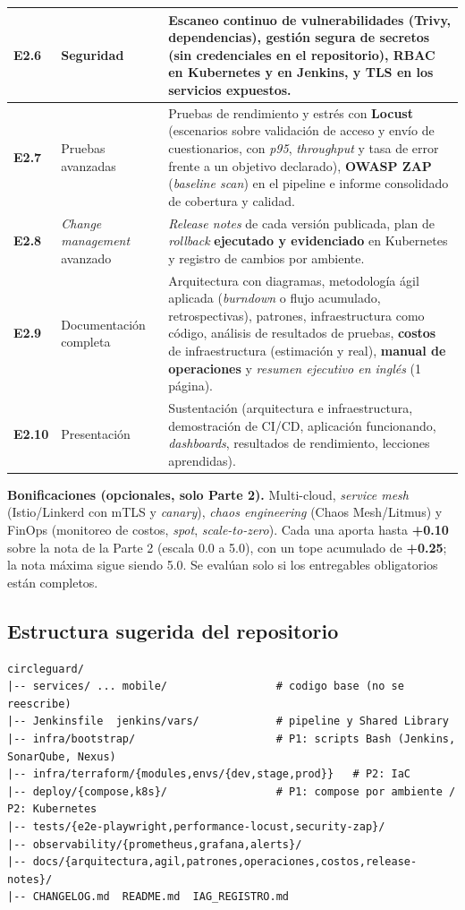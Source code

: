\documentclass[10pt,letterpaper]{article}
\begin{document}
\begin{tabularx}{\textwidth}{|L{1.0cm}|L{3.3cm}|X|}
\textbf{E2.6} & Seguridad & Escaneo continuo de vulnerabilidades (Trivy, dependencias), gestión segura de secretos (sin credenciales en el repositorio), RBAC en Kubernetes y en Jenkins, y \textbf{TLS} en los servicios expuestos. \\ \hline
\textbf{E2.7} & Pruebas avanzadas & Pruebas de rendimiento y estrés con \textbf{Locust} (escenarios sobre validación de acceso y envío de cuestionarios, con \textit{p95}, \textit{throughput} y tasa de error frente a un objetivo declarado), \textbf{OWASP ZAP} (\textit{baseline scan}) en el pipeline e informe consolidado de cobertura y calidad. \\ \hline
\textbf{E2.8} & \textit{Change management} avanzado & \textit{Release notes} de cada versión publicada, plan de \textit{rollback} \textbf{ejecutado y evidenciado} en Kubernetes y registro de cambios por ambiente. \\ \hline
\textbf{E2.9} & Documentación completa & Arquitectura con diagramas, metodología ágil aplicada (\textit{burndown} o flujo acumulado, retrospectivas), patrones, infraestructura como código, análisis de resultados de pruebas, \textbf{costos} de infraestructura (estimación y real), \textbf{manual de operaciones} y \textit{resumen ejecutivo en inglés} (1 página). \\ \hline
\textbf{E2.10} & Presentación & Sustentación (arquitectura e infraestructura, demostración de CI/CD, aplicación funcionando, \textit{dashboards}, resultados de rendimiento, lecciones aprendidas). \\ \hline
\end{tabularx}

\vspace{0.08cm}
\noindent\small\textbf{Bonificaciones (opcionales, solo Parte 2).} Multi-cloud, \textit{service mesh} (Istio/Linkerd con mTLS y \textit{canary}), \textit{chaos engineering} (Chaos Mesh/Litmus) y FinOps (monitoreo de costos, \textit{spot}, \textit{scale-to-zero}). Cada una aporta hasta \textbf{+0.10} sobre la nota de la Parte 2 (escala 0.0 a 5.0), con un tope acumulado de \textbf{+0.25}; la nota máxima sigue siendo 5.0. Se evalúan solo si los entregables obligatorios están completos.

\subsection{Estructura sugerida del repositorio}
\begin{lstlisting}[style=bashstyle]
circleguard/
|-- services/ ... mobile/                 # codigo base (no se reescribe)
|-- Jenkinsfile  jenkins/vars/            # pipeline y Shared Library
|-- infra/bootstrap/                      # P1: scripts Bash (Jenkins, SonarQube, Nexus)
|-- infra/terraform/{modules,envs/{dev,stage,prod}}   # P2: IaC
|-- deploy/{compose,k8s}/                 # P1: compose por ambiente / P2: Kubernetes
|-- tests/{e2e-playwright,performance-locust,security-zap}/
|-- observability/{prometheus,grafana,alerts}/
|-- docs/{arquitectura,agil,patrones,operaciones,costos,release-notes}/
|-- CHANGELOG.md  README.md  IAG_REGISTRO.md
\end{lstlisting}
\end{document}
